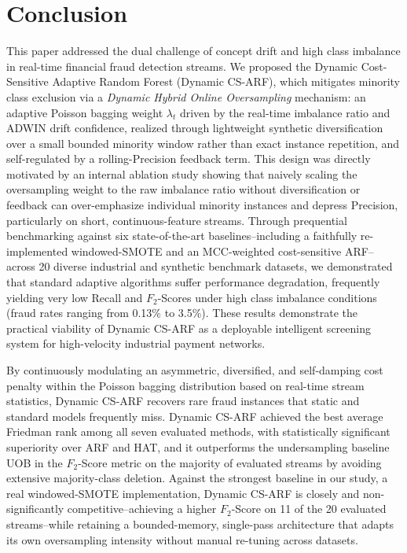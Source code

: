 \documentclass[review,12pt]{elsarticle}
\begin{document}
\section{Conclusion}
\label{sec:conclusion}
This paper addressed the dual challenge of concept drift and high class imbalance in real-time financial fraud detection streams. We proposed the Dynamic Cost-Sensitive Adaptive Random Forest (Dynamic CS-ARF), which mitigates minority class exclusion via a \textit{Dynamic Hybrid Online Oversampling} mechanism: an adaptive Poisson bagging weight $\lambda_t$ driven by the real-time imbalance ratio and ADWIN drift confidence, realized through lightweight synthetic diversification over a small bounded minority window rather than exact instance repetition, and self-regulated by a rolling-Precision feedback term. This design was directly motivated by an internal ablation study showing that naively scaling the oversampling weight to the raw imbalance ratio without diversification or feedback can over-emphasize individual minority instances and depress Precision, particularly on short, continuous-feature streams. Through prequential benchmarking against six state-of-the-art baselines--including a faithfully re-implemented windowed-SMOTE and an MCC-weighted cost-sensitive ARF--across 20 diverse industrial and synthetic benchmark datasets, we demonstrated that standard adaptive algorithms suffer performance degradation, frequently yielding very low Recall and $F_2$-Scores under high class imbalance conditions (fraud rates ranging from 0.13\% to 3.5\%). These results demonstrate the practical viability of Dynamic CS-ARF as a deployable intelligent screening system for high-velocity industrial payment networks.

By continuously modulating an asymmetric, diversified, and self-damping cost penalty within the Poisson bagging distribution based on real-time stream statistics, Dynamic CS-ARF recovers rare fraud instances that static and standard models frequently miss. Dynamic CS-ARF achieved the best average Friedman rank among all seven evaluated methods, with statistically significant superiority over ARF and HAT, and it outperforms the undersampling baseline UOB in the $F_2$-Score metric on the majority of evaluated streams by avoiding extensive majority-class deletion. Against the strongest baseline in our study, a real windowed-SMOTE implementation, Dynamic CS-ARF is closely and non-significantly competitive--achieving a higher $F_2$-Score on 11 of the 20 evaluated streams--while retaining a bounded-memory, single-pass architecture that adapts its own oversampling intensity without manual re-tuning across datasets.
\end{document}
